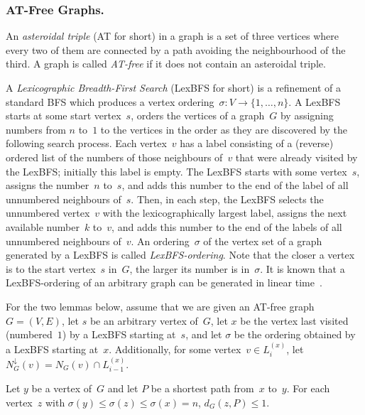 \subsubsection{AT-Free Graphs.}

An \emph{asteroidal triple} (AT for short) in a graph is a set of three vertices where every two of them are connected by a path avoiding the neighbourhood of the third.
A graph is called \emph{AT-free} if it does not contain an asteroidal triple.

A \emph{Lexicographic Breadth-First Search} (LexBFS for short) is a refinement of a standard BFS which produces a vertex ordering~$\sigma \colon V \rightarrow \{ 1, \ldots, n \}$.
A LexBFS starts at some start vertex~$s$, orders the vertices of a graph~$G$ by assigning numbers from $n$ to~$1$ to the vertices in the order as they are discovered by the following search process.
Each vertex~$v$ has a label consisting of a (reverse) ordered list of the numbers of those neighbours of~$v$ that were already visited by the LexBFS; initially this label is empty.
The LexBFS starts with some vertex~$s$, assigns the number~$n$ to~$s$, and adds this number to the end of the label of all unnumbered neighbours of~$s$.
Then, in each step, the LexBFS selects the unnumbered vertex~$v$ with the lexicographically largest label, assigns the next available number~$k$ to~$v$, and adds this number to the end of the labels of all unnumbered neighbours of~$v$.
An ordering~$\sigma$ of the vertex set of a graph generated by a LexBFS is called \emph{LexBFS-ordering}.
Note that the closer a vertex is to the start vertex~$s$ in~$G$, the larger its number is in~$\sigma$.
It is known that a LexBFS-ordering of an arbitrary graph can be generated in linear time~\cite{RoseTarjLuek1976}.

For the two lemmas below, assume that we are given an AT-free graph~$G = (V, E)$, let $s$ be an arbitrary vertex of~$G$, let $x$ be the vertex last visited (numbered~$1$) by a LexBFS starting at~$s$, and let $\sigma$ be the ordering obtained by a LexBFS starting at~$x$.
Additionally, for some vertex~$v \in L_i^{(x)}$, let $N_G^\downarrow(v) = N_G(v) \cap L_{i-1}^{(x)}$.

\begin{lemma}
    \label{lem:ATfreeDomPair}
Let \( y \) be a vertex of~\( G \) and let \( P \) be a shortest path from~\( x \) to~\( y \).
For each vertex~\( z \) with \( \sigma(y) \leq \sigma(z) \leq \sigma(x) = n \), \( d_G(z, P) \leq 1 \).
\end{lemma}

